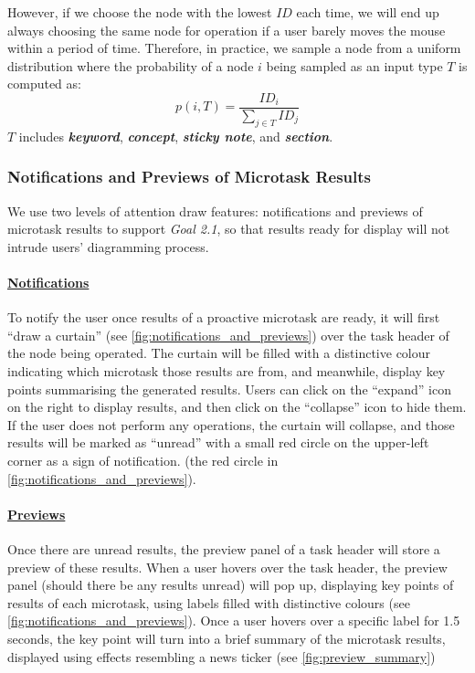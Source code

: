 However, if we choose the node with the lowest $ID$ each time, we will end up always choosing the same node for operation if a user barely moves the mouse within a period of time. Therefore, in practice, we sample a node from a uniform distribution where the probability of a node $i$ being sampled as an input type $T$ is computed as:
\begin{equation*}
p(i, T) = \frac{ID_i}{\sum_{j \in T} ID_j}
\end{equation*}
$T$ includes \textbf{\textcolor{keyword}{\textit{keyword}}}, \textbf{\textcolor{concept}{\textit{concept}}}, \textbf{\textcolor{sticky_note}{\textit{sticky note}}}, and \textbf{\textcolor{section}{\textit{section}}}.

\subsubsection{Notifications and Previews of Microtask Results}
We use two levels of attention draw features: notifications and previews of microtask results to support \textit{Goal 2.1}, so that results ready for display will not intrude users' diagramming process.



\paragraph{\underline{Notifications}}
To notify the user once results of a proactive microtask are ready, it will first ``draw a curtain'' (see \autoref{fig:notifications_and_previews}) over the task header of the node being operated. The curtain will be filled with a distinctive colour indicating which microtask those results are from, and meanwhile, display key points summarising the generated results. Users can click on the ``expand'' icon on the right to display results, and then click on the ``collapse'' icon to hide them. If the user does not perform any operations, the curtain will collapse, and those results will be marked as ``unread'' with a small red circle on the upper-left corner as a sign of notification. (the red circle in \autoref{fig:notifications_and_previews}).

\paragraph{\underline{Previews}}
Once there are unread results, the preview panel of a task header will store a preview of these results. When a user hovers over the task header, the preview panel (should there be any results unread) will pop up, displaying key points of results of each microtask, using labels filled with distinctive colours (see \autoref{fig:notifications_and_previews}). Once a user hovers over a specific label for 1.5 seconds, the key point will turn into a brief summary of the microtask results, displayed using effects resembling a news ticker (see \autoref{fig:preview_summary})

